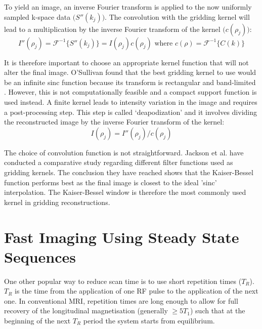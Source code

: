 To yield an image, an inverse Fourier transform is applied to the now uniformly sampled k-space data $\big( S''(k_j)\big)$. The convolution with the gridding kernel will lead to a multiplication by the inverse Fourier transform of the kernel $\big( c(\rho_j)\big)$:
\begin{equation}\label{eq:gridding3}
        I''(\rho_j) = \mathcal{F}^{-1} \{ S''(k_j) \} = I(\rho_j) c(\rho_j) \text{ where } c(\rho) = \mathcal{F}^{-1} \{ C(k) \}
\end{equation}

It is therefore important to choose an appropriate kernel function that will not alter the final image.
O'Sullivan found that the best gridding kernel to use would be an infinite sinc function because its transform is rectangular and band-limited \cite{OSullivan1985}.
However, this is not computationally feasible and a compact support function is used instead. 
A finite kernel leads to intensity variation in the image and requires a post-processing step.
This step is called `deapodization' and it involves dividing the reconstructed image by the inverse Fourier transform of the kernel:
\begin{equation}\label{eq:gridding4}
        I(\rho_j) = I''(\rho_j) / c(\rho_j)
\end{equation}

The choice of convolution function is not straightforward.
Jackson et al. \cite{Jackson1991} have conducted a comparative study regarding different filter functions used as gridding kernels.
The conclusion they have reached shows that the Kaiser-Bessel function performs best as the final image is closest to the ideal 'sinc' interpolation.
The Kaiser-Bessel window is therefore the most commonly used kernel in gridding reconstructions.

\section{Fast Imaging Using Steady State Sequences}\label{chapterlabel2sec14}

One other popular way to reduce scan time is to use short repetition times ($T_R$).
$T_R$ is the time from the application of one RF pulse to the application of the next one.
In conventional MRI, repetition times are long enough to allow for full recovery of the longitudinal magnetisation (generally $\geq 5 T_1$) such that at the beginning of the next $T_R$ period the system starts from equilibrium.

